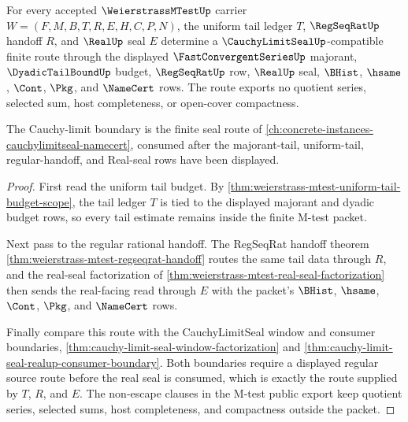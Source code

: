 \begin{theorem}
\label{thm:weierstrass-mtest-cauchy-limit-seal-route}
For every accepted $\WeierstrassMTestUp$ carrier $W=(F,M,B,T,R,E,H,C,P,N)$, the uniform tail ledger $T$, $\RegSeqRatUp$ handoff $R$, and $\RealUp$ seal $E$ determine a $\CauchyLimitSealUp$-compatible finite route through the displayed $\FastConvergentSeriesUp$ majorant, $\DyadicTailBoundUp$ budget, $\RegSeqRatUp$ row, $\RealUp$ seal, $\BHist$, $\hsame$, $\Cont$, $\Pkg$, and $\NameCert$ rows. The route exports no quotient series, selected sum, host completeness, or open-cover compactness.

The Cauchy-limit boundary is the finite seal route of \autoref{ch:concrete-instances-cauchylimitseal-namecert}, consumed after the majorant-tail, uniform-tail, regular-handoff, and Real-seal rows have been displayed.
\end{theorem}
\begin{proof}
First read the uniform tail budget. By \autoref{thm:weierstrass-mtest-uniform-tail-budget-scope}, the tail ledger $T$ is tied to the displayed majorant and dyadic budget rows, so every tail estimate remains inside the finite M-test packet.

Next pass to the regular rational handoff. The RegSeqRat handoff theorem \autoref{thm:weierstrass-mtest-regseqrat-handoff} routes the same tail data through $R$, and the real-seal factorization of \autoref{thm:weierstrass-mtest-real-seal-factorization} then sends the real-facing read through $E$ with the packet's $\BHist$, $\hsame$, $\Cont$, $\Pkg$, and $\NameCert$ rows.

Finally compare this route with the CauchyLimitSeal window and consumer boundaries, \autoref{thm:cauchy-limit-seal-window-factorization} and \autoref{thm:cauchy-limit-seal-realup-consumer-boundary}. Both boundaries require a displayed regular source route before the real seal is consumed, which is exactly the route supplied by $T$, $R$, and $E$. The non-escape clauses in the M-test public export keep quotient series, selected sums, host completeness, and compactness outside the packet.
\end{proof}


